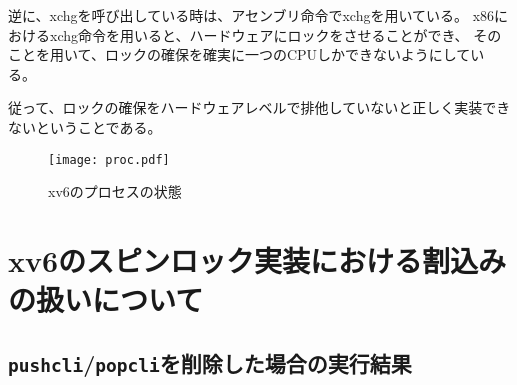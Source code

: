 \documentclass[10pt,a4j]{jarticle}
\begin{document}
逆に、xchgを呼び出している時は、アセンブリ命令でxchgを用いている。
x86におけるxchg命令を用いると、ハードウェアにロックをさせることができ\cite{xchg}、
そのことを用いて、ロックの確保を確実に一つのCPUしかできないようにしている。

従って、ロックの確保をハードウェアレベルで排他していないと正しく実装できないということである。
%
%
%
\begin{figure}
\centering %
\texttt{[image: proc.pdf]}
\caption{xv6のプロセスの状態}\label{fig:xv6proc}
\end{figure}


\section{xv6のスピンロック実装における割込みの扱いについて}

\subsection{\texttt{pushcli}/\texttt{popcli}を削除した場合の実行結果}

\end{document}
